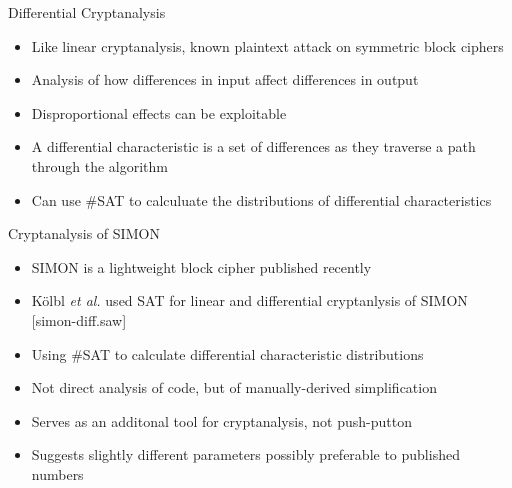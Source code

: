 \documentclass[ignorenonframetext,]{beamer}
\providecommand{\tightlist}{%
  \setlength{\itemsep}{0pt}\setlength{\parskip}{0pt}}
\newcommand{\infile}[1]{{\tiny \alert{[#1]}}}
\begin{document}
\begin{frame}{Differential Cryptanalysis}

\begin{itemize}
\tightlist
\item
  Like linear cryptanalysis, known plaintext attack on symmetric block
  ciphers
\item
  Analysis of how differences in input affect differences in output
\item
  Disproportional effects can be exploitable
\item
  A \alert{differential characteristic} is a set of differences as they
  traverse a path through the algorithm
\item
  Can use \#SAT to calculuate the distributions of differential
  characteristics
\end{itemize}

\end{frame}

\begin{frame}{Cryptanalysis of SIMON}

\begin{itemize}
\tightlist
\item
  SIMON is a lightweight block cipher published recently
\item
  Kölbl \emph{et al.} used SAT for linear and differential cryptanlysis
  of SIMON \cite{kolbl2015simon} \infile{simon-diff.saw}
\item
  Using \#SAT to calculate differential characteristic distributions
\item
  Not direct analysis of code, but of manually-derived simplification
\item
  Serves as an additonal tool for cryptanalysis, not push-putton
\item
  Suggests slightly different parameters possibly preferable to
  published numbers
\end{itemize}

\end{frame}
\end{document}
